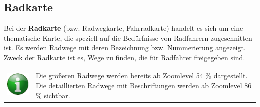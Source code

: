 \documentclass[10pt]{scrreprt}
\begin{document}
\vspace{5mm}
\subsection{Radkarte}  
Bei der \textbf{Radkarte} (bzw. Radwegkarte, Fahrradkarte) handelt es sich um eine thematische Karte, die speziell auf die Bedürfnisse von Radfahrern zugeschnitten ist. Es werden Radwege mit deren Bezeichnung bzw. Nummerierung angezeigt. Zweck der Radkarte ist es, Wege zu finden, die für Radfahrer freigegeben sind.

\vspace{3mm}
\begin{figure}[!htb]
	\centering
    \hspace{5mm}
\end{figure} 

\vspace{3mm}
\begin{tabular}{>{\centering \arraybackslash}m{1cm} m{14cm}}
\includegraphics[scale=0.5]{images/info.eps} & Die größeren Radwege werden bereits ab Zoomlevel 54 \% dargestellt. Die detaillierten Radwege mit Beschriftungen werden ab Zoomlevel 86 \% sichtbar.
\end{tabular}
\end{document}
